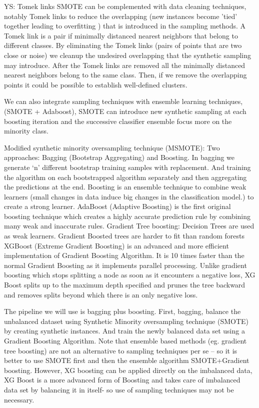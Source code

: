 \documentclass[12pt]{report}
\begin{document}
YS: Tomek links
SMOTE can be complemented with data cleaning techniques, notably Tomek links \cite{tomek1976two} to reduce the overlapping (new instances become 'tied' together leading to overfitting \cite{mease2007boosted}) that is introduced in the sampling methods.
A Tomek link is a pair if minimally distanced nearest neighbors that belong to different classes. By eliminating the Tomek links (pairs of points that are two close or noise) we cleanup the undesired overlapping that the synthetic sampling may introduce. After the Tomek links are removed all the minimally distanced nearest neighbors belong to the same class. Then, if we remove the overlapping points it could be possible to establish well-defined clusters. 

We can also integrate sampling techniques with ensemble learning techniques,  (SMOTE + Adaboost), SMOTE can introduce new synthetic sampling at each boosting iteration and the successive classifier ensemble focus more on the minority class.


Modified synthetic minority oversampling technique (MSMOTE): Two approaches: Bagging (Bootstrap Aggregating) and Boosting. In bagging we generate ‘n’ different bootstrap training samples with replacement. And training the algorithm on each bootstrapped algorithm separately and then aggregating the predictions at the end. 
Boosting is an ensemble technique to combine weak learners (small changes in data induce big changes in the classification model.) to create a strong learner. 
AdaBoost (Adaptive Boosting) is the first original boosting technique which creates a highly accurate prediction rule by combining many weak and inaccurate rules. 
Gradient Tree boosting: Decision Trees are used as weak learners. Gradient Boosted trees are harder to fit than random forests
XGBoost (Extreme Gradient Boosting) is an advanced and more efficient implementation of Gradient Boosting Algorithm. It is 10 times faster than the normal Gradient Boosting as it implements parallel processing. Unlike gradient boosting which stops splitting a node as soon as it encounters a negative loss, XG Boost splits up to the maximum depth specified and prunes the tree backward and removes splits beyond which there is an only negative loss.

The pipeline we will use is bagging plus boosting. First, bagging, balance the unbalanced dataset using Synthetic Minority oversampling technique (SMOTE) by creating synthetic instances. And train the newly balanced data set using a Gradient Boosting Algorithm. Note that ensemble based methods (eg. gradient tree boosting) are not an alternative to sampling techniques per se – so it is better to use SMOTE first and then  the ensemble algorithm SMOTE+Gradient boosting. However, XG boosting can be applied directly on the imbalanced data, XG Boost is a more advanced form of Boosting and takes care of imbalanced data set by balancing it in itself- so use of sampling techniques may not be necessary.
\end{document}
